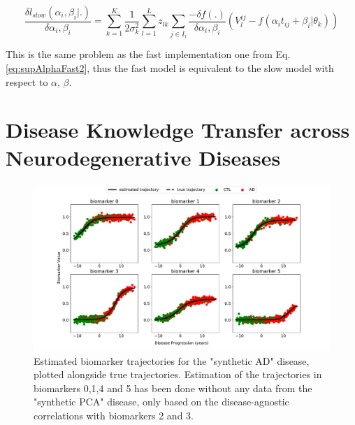 \begin{equation}
 \frac{\delta l_{slow}(\alpha_i, \beta_i|.)}{\delta \alpha_i, \beta_i} = \sum_{k=1}^K \frac{1}{2\sigma_k^2} \sum_{l=1}^L z_{lk} \sum_{j \in I_i} \frac{- \delta f(.)}{\delta \alpha_i, \beta_i} (V_l^{ij} - f(\alpha_i t_{ij} + \beta_i | \theta_k))
\end{equation}

This is the same problem as the fast implementation one from Eq. \ref{eq:supAlphaFast2}, thus the fast model is equivalent to the slow model with respect to $\alpha$, $\beta$.



\chapter{Disease Knowledge Transfer across Neurodegenerative Diseases}




\begin{figure}
\includegraphics[width=\textwidth]{images/dkt/trajDisSpaceDis0_101_synth1_JMD.pdf}
 \caption[Estimated biomarker trajectories for the "synthetic AD" disease, plotted alongside true trajectories.]{Estimated biomarker trajectories for the "synthetic AD" disease, plotted alongside true trajectories. Estimation of the trajectories in biomarkers 0,1,4 and 5 has been done without any data from the "synthetic PCA" disease, only based on the disease-agnostic correlations with biomarkers 2 and 3.}
 \label{fig:dktSynthTrajADSpace}
\end{figure}

